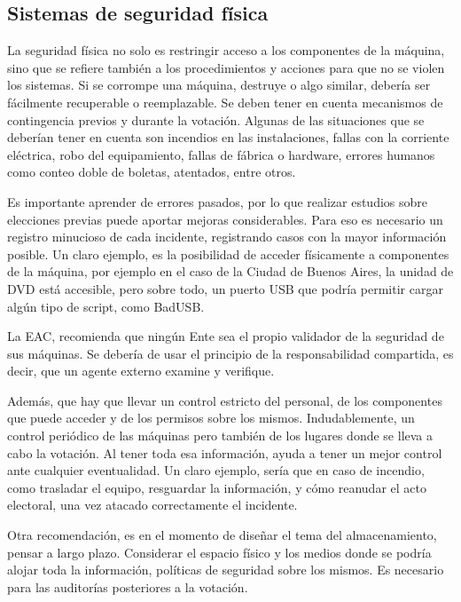 \subsection{Sistemas de seguridad física}

La seguridad física no solo es restringir acceso a los componentes de la máquina, sino que se refiere también a los procedimientos y acciones para que no se violen los sistemas. Si se corrompe una máquina, destruye o algo similar, debería ser fácilmente recuperable o reemplazable. Se deben tener en cuenta mecanismos de contingencia previos y durante la votación. Algunas de las situaciones que se deberían tener en cuenta son incendios en las instalaciones, fallas con la corriente eléctrica, robo del equipamiento, fallas de fábrica o hardware, errores humanos como conteo doble de boletas, atentados, entre otros.

Es importante aprender de errores pasados, por lo que realizar estudios sobre elecciones previas puede aportar mejoras considerables. Para eso es necesario un registro minucioso de cada incidente, registrando casos con la mayor información posible. Un claro ejemplo, es la posibilidad de acceder físicamente a componentes de la máquina, por ejemplo en el caso de la Ciudad de Buenos Aires, la unidad de DVD está accesible, pero sobre todo, un puerto USB que podría permitir cargar algún tipo de script, como BadUSB.

La EAC, recomienda que ningún Ente sea el propio validador de la seguridad de sus máquinas. Se debería de usar el principio de la responsabilidad compartida, es decir, que un agente externo examine y verifique.

Además, que hay que llevar un control estricto del personal, de los componentes que puede acceder y de los permisos sobre los mismos. Indudablemente, un control periódico de las máquinas pero también de los lugares donde se lleva a cabo la votación. Al tener toda esa información, ayuda a tener un mejor control ante cualquier eventualidad. Un claro ejemplo, sería que en caso de incendio, como trasladar el equipo, resguardar la información, y cómo reanudar el acto electoral, una vez atacado correctamente el incidente.

Otra recomendación, es en el momento de diseñar el tema del almacenamiento, pensar a largo plazo. Considerar el espacio físico y los medios donde se podría alojar toda la información, políticas de seguridad sobre los mismos. Es necesario para las auditorías posteriores a la votación.

